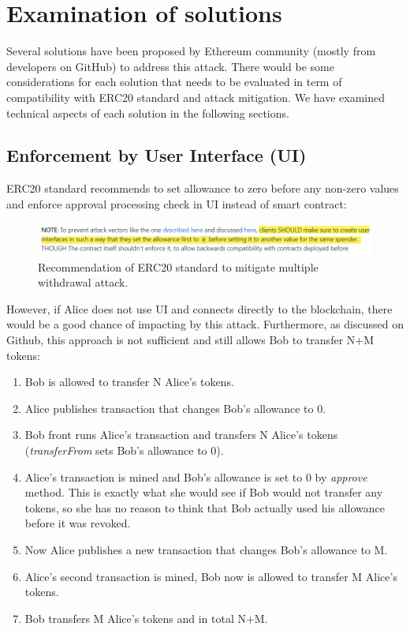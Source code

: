 \section{Examination of solutions}
Several solutions have been proposed by Ethereum community (mostly from developers on GitHub) to address this attack. There would be some considerations for each solution that needs to be evaluated in term of compatibility with ERC20 standard and attack mitigation. We have examined technical aspects of each solution in the following sections.

\subsection{Enforcement by User Interface (UI)}
ERC20 standard recommends to set allowance to zero before any non-zero values and enforce approval processing check in UI instead of smart contract:
\begin{figure}[H]
	\centering
	\includegraphics[width=1.0\linewidth]{figures/multiple_withdrawal_03.png}
	\caption{Recommendation of ERC20 standard to mitigate multiple withdrawal attack.}
\end{figure}
\noindent However, if Alice does not use UI and connects directly to the blockchain, there would be a good chance of impacting by this attack. Furthermore, as discussed on Github\cite{Ref14}, this approach is not sufficient and still allows Bob to transfer N+M tokens:
\begin{enumerate}
	\item Bob is allowed to transfer N Alice’s tokens.
	\item Alice publishes transaction that changes Bob’s allowance to 0.
	\item Bob front runs Alice’s transaction and transfers N Alice’s tokens (\textit{transferFrom} sets Bob’s allowance to 0).
	\item Alice’s transaction is mined and Bob’s allowance is set to 0 by \textit{approve} method. This is exactly what she would see if Bob would not transfer any tokens, so she has no reason to think that Bob actually used his allowance before it was revoked.
	\item Now Alice publishes a new transaction that changes Bob’s allowance to M.
	\item Alice’s second transaction is mined, Bob now is allowed to transfer M Alice’s tokens.
	\item Bob transfers M Alice’s tokens and in total N+M.\newline
\end{enumerate}
